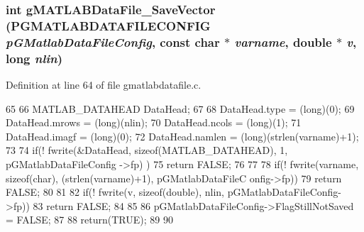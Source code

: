 \subsubsection[{gMATLABDataFile\_\-SaveVector}]{\setlength{\rightskip}{0pt plus 5cm}int gMATLABDataFile\_\-SaveVector ({\bf PGMATLABDATAFILECONFIG} {\em pGMatlabDataFileConfig}, \/  const char $\ast$ {\em varname}, \/  double $\ast$ {\em v}, \/  long {\em nlin})}\label{gmatlabdatafile_8h_a3ecf28836f545707551fe8b8005c8954}


Definition at line 64 of file gmatlabdatafile.c.


\begin{DoxyCode}
65 {
66         MATLAB_DATAHEAD DataHead;
67 
68         DataHead.type  = (long)(0);             
69         DataHead.mrows = (long)(nlin);  
70         DataHead.ncols = (long)(1);
71         DataHead.imagf = (long)(0);
72         DataHead.namlen = (long)(strlen(varname)+1);
73 
74         if(! fwrite(&DataHead, sizeof(MATLAB_DATAHEAD), 1, pGMatlabDataFileConfig
      ->fp) ){
75                 return FALSE;
76         }
77 
78         if(! fwrite(varname, sizeof(char), (strlen(varname)+1), pGMatlabDataFileC
      onfig->fp)){
79                 return FALSE;
80         }
81 
82         if(! fwrite(v, sizeof(double), nlin, pGMatlabDataFileConfig->fp)){
83                 return FALSE;
84         }
85 
86         pGMatlabDataFileConfig->FlagStillNotSaved = FALSE;
87 
88         return(TRUE);
89 
90 }
\end{DoxyCode}
